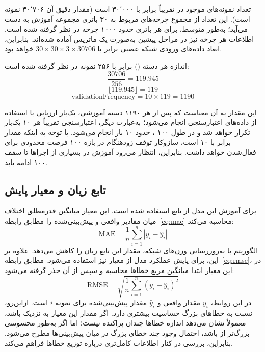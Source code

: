 \begin{center}
\end{center}

تعداد نمونه‌های موجود در  تقریباً برابر با ۳۰٬۰۰۰ است (مقدار دقیق آن ۳۰٬۷۰۶ نمونه است). این تعداد از مجموع چرخه‌های مربوط به ۳۰ باتری مجموعه آموزش به دست می‌آید؛ به‌طور متوسط، برای هر باتری حدود ۱۰۰۰ چرخه در نظر گرفته شده است. اطلاعات هر چرخه نیز در مراحل پیشین به‌صورت یک ماتریس آماده شده‌اند. بنابراین، ابعاد داده‌های ورودی شبکه عصبی برابر با $30\times30\times3\times30706$ خواهد بود.

اندازه هر دسته () برابر با ۲۵۶ نمونه در نظر گرفته شده است:
\[
\frac{30706}{256} = 119.945
\]
\[
\lfloor 119.945 \rfloor = 119
\]
\[
\mathrm{validationFrequency} = 10 \times 119 = 1190
\]

این مقدار به آن معناست که پس از هر ۱۱۹۰ دسته آموزشی، یک‌بار ارزیابی با استفاده از داده‌های اعتبارسنجی انجام می‌شود؛ به‌عبارت دیگر، اعتبارسنجی تقریباً هر ۱۰  یک‌بار تکرار خواهد شد و در طول ۱۰۰ ، حدود ۱۰ بار انجام می‌شود. با توجه به اینکه مقدار  برابر با ۱۰ است، سازوکار توقف زودهنگام در بازه ۱۰۰  فرصت محدودی برای فعال‌شدن خواهد داشت. بنابراین، انتظار می‌رود آموزش در بسیاری از اجراها تا سقف ۱۰۰  ادامه یابد.

\subsection{تابع زیان و معیار پایش}

برای آموزش این مدل از تابع  استفاده شده است. این معیار میانگین قدرمطلق اختلاف میان مقادیر واقعی و پیش‌بینی‌شده را مطابق رابطه~\eqref{eq:mae} محاسبه می‌کند:
\begin{equation}
\mathrm{MAE} = \frac{1}{n}\sum_{i=1}^{n}\left| y_i - \hat{y}_i \right|
\label{eq:mae}
\end{equation}
الگوریتم  با به‌روزرسانی وزن‌های شبکه، مقدار این تابع زیان را کاهش می‌دهد. علاوه بر این، برای پایش عملکرد مدل از معیار  نیز استفاده می‌شود. مطابق رابطه~\eqref{eq:rmse}، در این معیار ابتدا میانگین مربع خطاها محاسبه و سپس از آن جذر گرفته می‌شود:
\begin{equation}
\mathrm{RMSE} = \sqrt{\frac{1}{n}\sum_{i=1}^{n}\left( y_i - \hat{y}_i \right)^{2}}
\label{eq:rmse}
\end{equation}
در این روابط، $y_i$ مقدار واقعی و $\hat{y}_i$ مقدار پیش‌بینی‌شده برای نمونه $i$ است. ازاین‌رو،  نسبت به خطاهای بزرگ حساسیت بیشتری دارد. اگر مقدار این معیار به  نزدیک باشد، معمولاً نشان می‌دهد اندازه خطاها چندان پراکنده نیست؛ اما اگر  به‌طور محسوسی بزرگ‌تر از  باشد، احتمال وجود چند خطای بزرگ در میان پیش‌بینی‌ها مطرح می‌شود. بنابراین، بررسی  در کنار  اطلاعات کامل‌تری درباره توزیع خطاها فراهم می‌کند.
